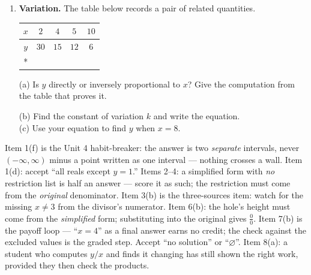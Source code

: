 \documentclass[10pt]{article}
\begin{document}
\begin{enumerate}[leftmargin=1.9em, itemsep=10pt]
  \item \textbf{Variation.} The table below records a pair of related quantities.
        \begin{center}
        \renewcommand{\arraystretch}{1.25}
        \begin{tabular}{|c|c|c|c|c|}
        \hline
        $x$ & $2$ & $4$ & $5$ & $10$ \\ \hline
        $y$ & $30$ & $15$ & $12$ & $6$ \\* \hline
        \end{tabular}
        \end{center}
        (a) Is $y$ directly or inversely proportional to $x$? Give the computation from the table that
            proves it.
 \rubricbox{\gradedblank[id=qc8a, type=rubric, points=1, rubric={../rubrics/alg2-u04-practice-test-qc8a.yaml}, display={Inversely --- the \emph{products} are constant: $2\cdot30=4\cdot15=5\cdot12=10\cdot6=60$ (the ratios $y/x$ are not)}]{\linewidth}{10pt}}\par
        (b) Find the constant of variation $k$ and write the equation. \inblank{\blank{5.0cm}}{\gradedblank[id=qc8b, type=short, points=1, answer={y=60/x}, display={$k=60$, so $y=60/x$}]{5.0cm-2pt}{10pt}}
        \\[4pt]
        (c) Use your equation to find $y$ when $x=8$. \inblank{\blank{3.0cm}}{\gradedblank[id=qc8c, type=short, points=1, answer={7.5}, check=numeric, display={$y=60/8=7.5$}]{3.0cm-2pt}{10pt}}
\end{enumerate}

\begin{teachernote}
Item 1(f) is the Unit 4 habit-breaker: the answer is two \emph{separate} intervals, never
$(-\infty,\infty)$ minus a point written as one interval --- nothing crosses a wall. Item 1(d):
accept ``all reals except $y=1$.'' Items 2--4: a simplified form with \emph{no} restriction list is
half an answer --- score it as such; the restriction must come from the \emph{original} denominator.
Item 3(b) is the three-sources item: watch for the missing $x\ne3$ from the divisor's numerator.
Item 6(b): the hole's height must come from the \emph{simplified} form; substituting into the
original gives $\tfrac00$. Item 7(b) is the payoff loop --- ``$x=4$'' as a final answer earns no
credit; the check against the excluded values is the graded step. Accept ``no solution'' or
``$\varnothing$''. Item 8(a): a student who computes $y/x$ and finds it changing has still shown
the right work, provided they then check the products.
\end{teachernote}
\end{document}
